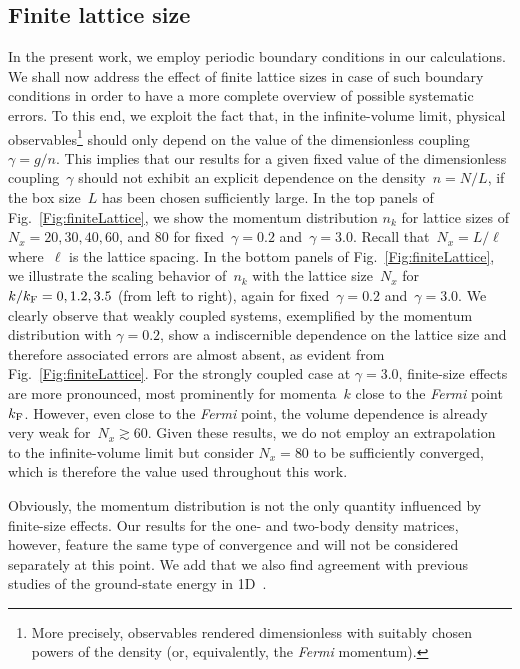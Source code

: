 \documentclass[pra,aps,groupedaddress,floatfix,twocolumn,superscriptaddress,showpacs,nofootinbib]{revtex4-1}
\newcommand{\kf}{k_\textnormal{F}}
\begin{document}
\subsection{Finite lattice size}
%
{In the present work, we employ periodic boundary conditions in our calculations.
We shall now address the effect of finite lattice sizes in case of such boundary conditions in} order to have a more complete
overview of possible systematic errors.
To this end, we exploit the fact that, in the infinite-volume limit,
physical observables\footnote{More precisely, observables rendered dimensionless
with suitably chosen powers of the density (or, equivalently, the {\it Fermi} momentum).} should only depend on the value of the dimensionless coupling~$\gamma=g/n$.
This implies that our results for a given
fixed value of the dimensionless coupling~$\gamma$ should not exhibit an explicit dependence on the density~$n=N/L$, if the box size~$L$ has been
chosen sufficiently large.
In  the top panels of Fig.~\ref{Fig:finiteLattice}, we show the momentum distribution $n_k$ for lattice sizes of $N_x = 20, 30, 40, 60$, and $80$
for fixed~$\gamma=0.2$ and~$\gamma=3.0$. Recall that~$N_x=L/\ell$ where~$\ell$ is the lattice spacing.
In the bottom panels of Fig.~\ref{Fig:finiteLattice}, we illustrate the scaling behavior of~$n_k$ with the lattice size~$N_x$ for $k/\kf=0, 1.2, 3.5$ (from left to right), again
for fixed~$\gamma=0.2$ and~$\gamma=3.0$.
We clearly observe that weakly coupled systems,
exemplified by the momentum distribution with $\gamma=0.2$, show a indiscernible
dependence on the lattice size and therefore associated errors are almost absent, as evident
from Fig.~\ref{Fig:finiteLattice}. For the strongly coupled case at $\gamma=3.0$, finite-size effects are more
pronounced, most prominently for momenta~$k$ close to the {\it Fermi} point~$\kf$. However, even close to the {\it Fermi} point, the volume dependence
is already very weak for~$N_x\gtrsim 60$. Given these results, we do not employ an extrapolation to the infinite-volume limit but consider {$N_x = 80$} to be sufficiently converged, which
is therefore the value used throughout this work.

Obviously, the momentum distribution is not the only quantity influenced by finite-size effects.
{Our results for the one- and two-body density matrices, however, feature} the
same type of convergence and will not be considered separately at this point. We add that we also find agreement with previous
studies of the ground-state energy in 1D~\cite{GCS1D}.
\end{document}
